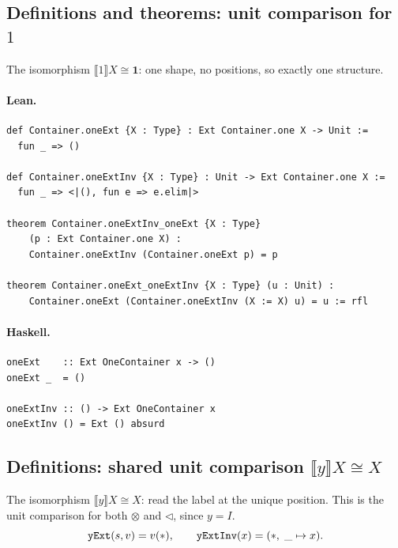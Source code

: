 \documentclass[11pt,a4paper]{article}
\begin{document}
\subsection{Definitions and theorems: unit comparison for $1$}

\begin{defn}
The isomorphism $\llbracket 1 \rrbracket X \cong \mathbf{1}$:
one shape, no positions, so exactly one structure.
\end{defn}

\paragraph{Lean.}
\begin{lstlisting}[style=lean]
def Container.oneExt {X : Type} : Ext Container.one X -> Unit :=
  fun _ => ()

def Container.oneExtInv {X : Type} : Unit -> Ext Container.one X :=
  fun _ => <|(), fun e => e.elim|>

theorem Container.oneExtInv_oneExt {X : Type}
    (p : Ext Container.one X) :
    Container.oneExtInv (Container.oneExt p) = p

theorem Container.oneExt_oneExtInv {X : Type} (u : Unit) :
    Container.oneExt (Container.oneExtInv (X := X) u) = u := rfl
\end{lstlisting}

\paragraph{Haskell.}
\begin{lstlisting}[style=haskell]
oneExt    :: Ext OneContainer x -> ()
oneExt _  = ()

oneExtInv :: () -> Ext OneContainer x
oneExtInv () = Ext () absurd
\end{lstlisting}


\subsection{Definitions: shared unit comparison \texorpdfstring{$\llbracket y \rrbracket X \cong X$}{[y] X = X}}

\begin{defn}[Unit comparison for $y = I$]
The isomorphism $\llbracket y \rrbracket X \cong X$: read the label at the unique
position.  This is the unit comparison for both $\otimes$ and $\triangleleft$,
since $y = I$.
\[
  \texttt{yExt}(s, v) = v(\ast), \qquad
  \texttt{yExtInv}(x) = (\ast,\; \_\mapsto x).
\]
\end{defn}
\end{document}
